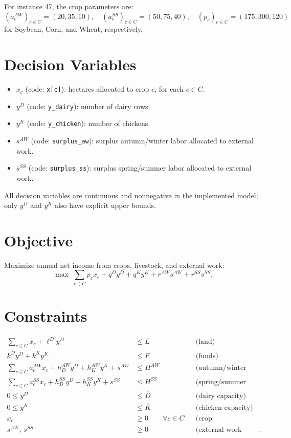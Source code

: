 For instance 47, the crop parameters are:
\[
(a_c^{AW})_{c \in C}=(20,35,10),\quad
(a_c^{SS})_{c \in C}=(50,75,40),\quad
(p_c)_{c \in C}=(175,300,120)
\]
for Soybean, Corn, and Wheat, respectively.

\section*{Decision Variables}

\begin{itemize}
    \item $x_c$ (code: \texttt{x[c]}): hectares allocated to crop $c$, for each $c \in C$.
    \item $y^D$ (code: \texttt{y\_dairy}): number of dairy cows.
    \item $y^K$ (code: \texttt{y\_chicken}): number of chickens.
    \item $s^{AW}$ (code: \texttt{surplus\_aw}): surplus autumn/winter labor allocated to external work.
    \item $s^{SS}$ (code: \texttt{surplus\_ss}): surplus spring/summer labor allocated to external work.
\end{itemize}

All decision variables are continuous and nonnegative in the implemented model; only $y^D$ and $y^K$ also have explicit upper bounds.

\section*{Objective}

Maximize annual net income from crops, livestock, and external work:
\[
\max \;
\sum_{c \in C} p_c x_c
+ q^D y^D
+ q^K y^K
+ r^{AW} s^{AW}
+ r^{SS} s^{SS}.
\]

\section*{Constraints}

\begin{align}
\sum_{c \in C} x_c + \ell^D y^D &\le L
&& \text{(land)} \\
k^D y^D + k^K y^K &\le F
&& \text{(funds)} \\
\sum_{c \in C} a_c^{AW} x_c + h_D^{AW} y^D + h_K^{AW} y^K + s^{AW} &\le H^{AW}
&& \text{(autumn/winter labor)} \\
\sum_{c \in C} a_c^{SS} x_c + h_D^{SS} y^D + h_K^{SS} y^K + s^{SS} &\le H^{SS}
&& \text{(spring/summer labor)} \\
0 \le y^D &\le \overline{D}
&& \text{(dairy capacity)} \\
0 \le y^K &\le \overline{K}
&& \text{(chicken capacity)} \\
x_c &\ge 0 \qquad \forall c \in C
&& \text{(crop nonnegativity)} \\
s^{AW},\, s^{SS} &\ge 0
&& \text{(external work nonnegativity)}.
\end{align}

